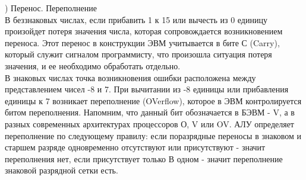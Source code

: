 ) Перенос. Переполнение \\
В беззнаковых числах, если прибавить 1 к 15 или вычесть из 0 единицу произойдет потеря значения числа, которая сопровождается возникновением переноса. Этот перенос в конструкции ЭВМ учитывается в бите С (Carry), который служит сигналом программисту, что произошла ситуация потеря значения, и ее необходимо обработать отдельно. \\
В знаковых числах точка возникновения ошибки расположена между представлением чисел -8 и 7. При вычитании из -8 единицы или прибавления единицы к 7 возникает переполнение (OVerflow), которое в ЭВМ контролируется битом переполнения. Напомним, что данный бит обозначается в БЭВМ - V, а в разных современных архитектурах процессоров О, V или OV. АЛУ определяет переполнение по следующему правилу: если поразрядные переносы в знаковом и старшем разряде одновременно отсутствуют или присутствуют - значит переполнения нет, если присутствует только В одном - значит переполнение знаковой разрядной сетки есть.

